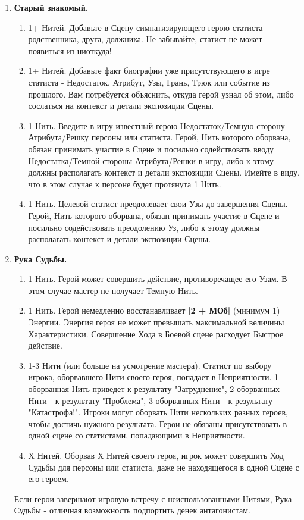 \begin{enumerate}
    \item \textbf{Старый знакомый.}
    \begin{enumerate}
        \item 1+ Нитей. Добавьте в Сцену симпатизирующего герою статиста - родственника, друга, должника. Не забывайте, статист не может появиться из ниоткуда!
        \item 1+ Нитей. Добавьте факт биографии уже присутствующего в игре статиста - Недостаток, Атрибут, Узы, Грань, Трюк или событие из прошлого. Вам потребуется объяснить, откуда герой узнал об этом, либо сослаться на контекст и детали экспозиции Сцены.
        \item 1 Нить. Введите в игру известный герою Недостаток/Темную сторону Атрибута/Решку персоны или статиста. Герой, Нить которого оборвана, обязан принимать участие в Сцене и посильно содействовать вводу Недостатка/Темной стороны Атрибута/Решки в игру, либо к этому должны располагать контекст и детали экспозиции Сцены.
        \newline Имейте в виду, что в этом случае к персоне будет протянута 1 Нить.
        \item 1 Нить. Целевой статист преодолевает свои Узы до завершения Сцены. Герой, Нить которого оборвана, обязан принимать участие в Сцене и посильно содействовать преодолению Уз, либо к этому должны располагать контекст и детали экспозиции Сцены.
    \end{enumerate}

    \item \textbf{Рука Судьбы.}
	\begin{enumerate}
        \item 1 Нить. Герой может совершить действие, противоречащее его Узам. В этом случае мастер не получает Темную Нить.
        \item 1 Нить. Герой немедленно восстанавливает \textbf{|2 + МОб|} (минимум 1) Энергии. Энергия героя не может превышать максимальной величины Характеристики. Совершение Хода в Боевой сцене расходует Быстрое действие.
        \item 1-3 Нити (или больше на усмотрение мастера). Статист по выбору игрока, оборвавшего Нити своего героя, попадает в Неприятности. 1 оборванная Нить приведет к результату "Затруднение", 2 оборванных Нити - к результату "Проблема", 3 оборванных Нити - к результату "Катастрофа!". Игроки могут оборвать Нити нескольких разных героев, чтобы достичь нужного результата. Герои не обязаны присутствовать в одной сцене со статистами, попадающими в Неприятности.
        \item X Нитей. Оборвав X Нитей своего героя, игрок может совершить Ход Судьбы для персоны или статиста, даже не находящегося в одной Сцене с его героем.
    \end{enumerate}
    \begin{tcolorbox}
        Если герои завершают игровую встречу с неиспользованными Нитями, Рука Судьбы - отличная возможность подпортить денек антагонистам.
    \end{tcolorbox}


\end{enumerate}
